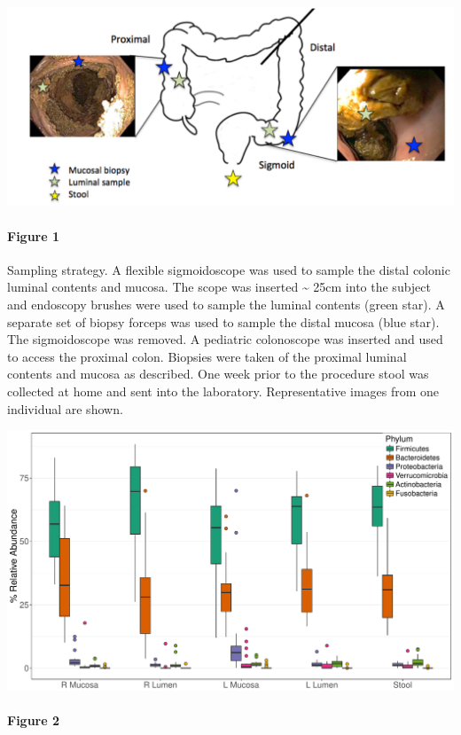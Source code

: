 \documentclass[11pt,]{article}
\let\oldparagraph\paragraph
\renewcommand{\paragraph}[1]{\oldparagraph{#1}\mbox{}}
\begin{document}
\includegraphics{submission/figure_1.pdf}

\paragraph{Figure 1}\label{figure-1}

Sampling strategy. A flexible sigmoidoscope was used to sample the
distal colonic luminal contents and mucosa. The scope was inserted
\textasciitilde{} 25cm into the subject and endoscopy brushes were used
to sample the luminal contents (green star). A separate set of biopsy
forceps was used to sample the distal mucosa (blue star). The
sigmoidoscope was removed. A pediatric colonoscope was inserted and used
to access the proximal colon. Biopsies were taken of the proximal
luminal contents and mucosa as described. One week prior to the
procedure stool was collected at home and sent into the laboratory.
Representative images from one individual are shown.

\newpage

\includegraphics{submission/figure_2.pdf}

\paragraph{Figure 2}\label{figure-2}
\end{document}
